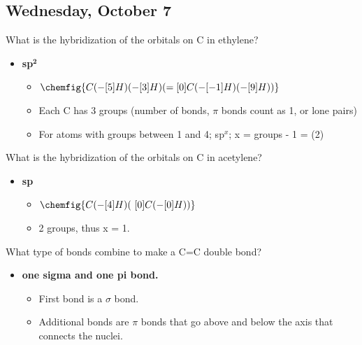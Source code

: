 \documentclass[12pt,a4paper]{article}
\begin{document}
\subsection{Wednesday, October 7}
\begin{enumerate}
    {\color{G-Moon}\item What is the hybridization of the orbitals on C in ethylene?}
        \begin{itemize}
            \item {\color{o-Sun}\textbf{sp\(\bm{^{2}}\)}}
            \begin{itemize}
                \item $\chemfig{C(-[5]H)(-[3]H)(=[0]C(-[-1]H)(-[9]H))}$
                \item Each C has 3 groups (number of bonds, $\pi$ bonds count as 1, or lone pairs)
                \item For atoms with groups between 1 and 4; sp{\color{o-Sun}\(^{x}\)}; x = groups - 1 = ({\color{o-Sun}2})
            \end{itemize}
        \end{itemize}
    {\color{G-Moon}\item What is the hybridization of the orbitals on C in acetylene?}
        \begin{itemize}
            \item {\color{o-Sun}\textbf{sp}}
                \begin{itemize}
                    \item $\chemfig{C(-[4]H)(~[0]C(-[0]H))}$
                    \item 2 groups, thus x = 1.
                \end{itemize}
        \end{itemize}
    {\color{G-Moon}\item What type of bonds combine to make a C=C double bond?}
        \begin{itemize}
            \item {\color{o-Sun}\textbf{one sigma and one pi bond.}}
                \begin{itemize}
                    \item First bond is a $\sigma$ bond.
                    \item Additional bonds are $\pi$ bonds that go above and below the axis that connects the nuclei.
                \end{itemize}
        \end{itemize}

\end{enumerate}
\end{document}
